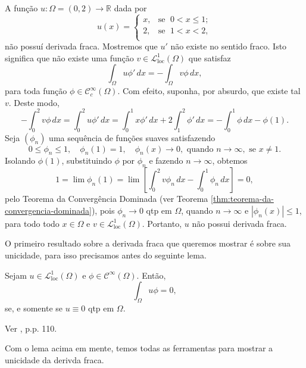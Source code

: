 \documentclass[a4paper, 11pt]{book}
\theoremstyle{definition}
\newcommand{\bR}{\mathbb{R}}
\newcommand{\cC}{\mathcal{C}}
\newcommand{\cL}{\mathcal{L}}
\newcommand{\loc}{\mathrm{loc}}
\begin{document}
\begin{ex}
    A função $u : \Omega  = (0,2) \to \bR$ dada por
    \[
        u(x) = \left\{
            \begin{array}{rl}
                x, & \!\text{se }\; 0 < x \leqslant 1;\\
                2, & \!\text{se }\; 1 < x < 2,\\
            \end{array}
        \right.
    \]
    não possuí derivada fraca.
    Mostremos que $u'$ não existe no sentido fraco.
    Isto significa que não existe uma função $v \in \cL^1_\loc(\Omega)$ que satisfaz
    \[
        \int_\Omega u \phi' \, dx = -\int_\Omega v \phi \,dx,
    \]
    para toda função $\phi \in \cC_c^\infty(\Omega)$. 
    Com efeito, suponha, por absurdo, que existe tal $v$. Deste modo,
    \[
        -\int_0^2 v \phi \, dx = \int_0^2 u \phi' \,dx = \int_0^1 x \phi' \,dx + 2\int_1^2 \phi' \,dx =- \int_0^1 \phi \,dx - \phi(1).
    \]
    Seja $(\phi_n)$ uma sequência de funções suaves satisfazendo
    \[
        0 \leqslant \phi_n \leqslant 1, \quad \phi_n(1) = 1, \quad \phi_n(x) \to 0, \text{ quando } n\to\infty,\text{ se } x \neq 1.
    \]
    Isolando $\phi(1)$, substituindo $\phi$ por $\phi_n$ e fazendo $n \to \infty$, obtemos
    \[
        1 = \lim \phi_n(1) = \lim \left[ \int_0^2 v \phi_n \, dx- \int_0^1 \phi_n \,dx \right] = 0,
    \]
    pelo Teorema da Convergência Dominada (ver Teorema \ref{thm:teorema-da-convergencia-dominada}), pois $\phi_n \to 0$ qtp em $\Omega$, quando $n\to\infty$ e $|\phi_n(x)| \leqslant 1$, para todo todo $x \in \Omega$ e $v \in \cL^1_\loc(\Omega)$.
    Portanto, $u$ não possui derivada fraca.
\end{ex}

O primeiro resultado sobre a derivada fraca que queremos mostrar é sobre sua unicidade, para isso precisamos antes do seguinte lema.

\begin{lbox} \label{lm:lema}
    Sejam $u \in \cL^1_{\loc}(\Omega)$ e $\phi \in \cC^\infty(\Omega)$.
    Então,
    \[
        \int_\Omega u \phi = 0,
    \]
    se, e somente se $u \equiv 0$ qtp em $\Omega$.
\end{lbox}
\begin{prf}
    Ver \cite{brezis-functional.analysis}, p.p. 110.
\end{prf}

Com o lema acima em mente, temos todas as ferramentas para mostrar a unicidade da derivda fraca.
\end{document}
